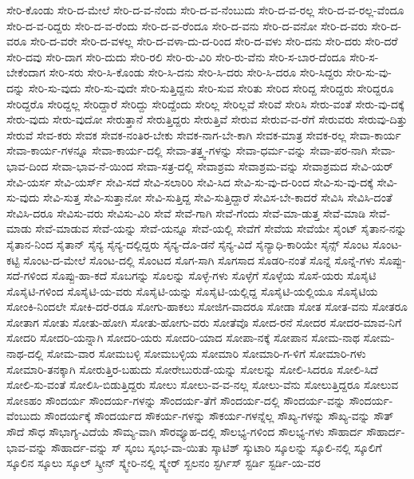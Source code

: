 {ಸೇರಿ-ಕೊಂಡು
ಸೇರಿ-ದ-ಮೇಲೆ
ಸೇರಿ-ದ-ವ-ನೆಂದು
ಸೇರಿ-ದ-ವ-ನೆಂಬುದು
ಸೇರಿ-ದ-ವ-ರಲ್ಲ
ಸೇರಿ-ದ-ವ-ರಲ್ಲ-ವೆಂದೂ
ಸೇರಿ-ದ-ವ-ರಿದ್ದರು
ಸೇರಿ-ದ-ವ-ರೆಂದು
ಸೇರಿ-ದ-ವ-ರೆಂದೂ
ಸೇರಿ-ದ-ವನು
ಸೇರಿ-ದ-ವನೋ
ಸೇರಿ-ದ-ವರು
ಸೇರಿ-ದ-ವರೂ
ಸೇರಿ-ದ-ವರೇ
ಸೇರಿ-ದ-ವಳಲ್ಲ
ಸೇರಿ-ದ-ವಳಾ-ದು-ದ-ರಿಂದ
ಸೇರಿ-ದ-ವಳು
ಸೇರಿ-ದನು
ಸೇರಿ-ದರು
ಸೇರಿ-ದರೆ
ಸೇರಿ-ದವು
ಸೇರಿ-ದಾಗ
ಸೇರಿ-ದುದು
ಸೇರಿ-ರಲಿ
ಸೇರಿ-ರು-ವಿರಿ
ಸೇರಿ-ರು-ವೆನು
ಸೇರಿ-ಸ-ಬಾರ-ದೆಂದೂ
ಸೇರಿ-ಸ-ಬೇಕೆಂದಾಗ
ಸೇರಿ-ಸರು
ಸೇರಿ-ಸಿ-ಕೊಂಡು
ಸೇರಿ-ಸಿ-ದನು
ಸೇರಿ-ಸಿ-ದರು
ಸೇರಿ-ಸಿ-ದರೂ
ಸೇರಿ-ಸಿದ್ದರು
ಸೇರಿ-ಸು-ವು-ದನ್ನು
ಸೇರಿ-ಸು-ವುದು
ಸೇರಿ-ಸು-ವುದೇ
ಸೇರಿ-ಸುತ್ತಿದ್ದನು
ಸೇರಿ-ಸುವ
ಸೇರಿತು
ಸೇರಿದ
ಸೇರಿದ್ದ
ಸೇರಿದ್ದರು
ಸೇರಿದ್ದರೂ
ಸೇರಿದ್ದರೊ
ಸೇರಿದ್ದಲ್ಲ
ಸೇರಿದ್ದಾರೆ
ಸೇರಿದ್ದು
ಸೇರಿದ್ದೆಂದು
ಸೇರಿಲ್ಲ
ಸೇರಿಲ್ಲವೆ
ಸೇರಿವೆ
ಸೇರಿಸಿ
ಸೇರು-ವಂತೆ
ಸೇರು-ವು-ದಕ್ಕೆ
ಸೇರು-ವುದು
ಸೇರು-ವುದೋ
ಸೇರುತ್ತಾನೆ
ಸೇರುತ್ತಿದ್ದರು
ಸೇರುತ್ತಿವೆ
ಸೇರುವ
ಸೇರುವ-ವ-ರೆಗೆ
ಸೇರುವರು
ಸೇರುವು-ದಿತ್ತು
ಸೇರುವೆ
ಸೇವ-ಕರು
ಸೇವಕ
ಸೇವಕ-ನಂತಿರ-ಬೇಕು
ಸೇವಕ-ನಾಗ-ಬೇ-ಕಾಗಿ
ಸೇವಕ-ಮಾತ್ರ
ಸೇವಕ-ರಲ್ಲ
ಸೇವಾ-ಕಾರ್ಯ
ಸೇವಾ-ಕಾರ್ಯ-ಗಳನ್ನೂ
ಸೇವಾ-ಕಾರ್ಯ-ದಲ್ಲಿ
ಸೇವಾ-ತತ್ತ್ವ-ಗಳನ್ನು
ಸೇವಾ-ಧರ್ಮ-ವನ್ನು
ಸೇವಾ-ಪರ-ನಾಗಿ
ಸೇವಾ-ಭಾವ-ದಿಂದ
ಸೇವಾ-ಭಾವ-ನೆ-ಯಿಂದ
ಸೇವಾ-ಸತ್ರ-ದಲ್ಲಿ
ಸೇವಾಶ್ರಮ
ಸೇವಾಶ್ರಮ-ವನ್ನು
ಸೇವಾಶ್ರಮದ
ಸೇವಿ-ಯರ್
ಸೇವಿ-ಯರ್ಸ
ಸೇವಿ-ಯರ್ಸ್
ಸೇವಿ-ಸದೆ
ಸೇವಿ-ಸಲಾರಿರಿ
ಸೇವಿ-ಸಿದ
ಸೇವಿ-ಸು-ವು-ದ-ರಿಂದ
ಸೇವಿ-ಸು-ವು-ದಕ್ಕೆ
ಸೇವಿ-ಸು-ವುದು
ಸೇವಿ-ಸುತ್ತ
ಸೇವಿ-ಸುತ್ತಾನೋ
ಸೇವಿ-ಸುತ್ತಿದ್ದ
ಸೇವಿ-ಸುತ್ತಿದ್ದಾರೆ
ಸೇವಿಸ-ಬೇ-ಕಾದರೆ
ಸೇವಿಸಿ
ಸೇವಿಸಿ-ದಂತೆ
ಸೇವಿಸಿ-ದರೂ
ಸೇವಿಸು-ವರು
ಸೇವಿಸು-ವಿರಿ
ಸೇವೆ
ಸೇವೆ-ಗಾಗಿ
ಸೇವೆ-ಗೆಂದು
ಸೇವೆ-ಮಾ-ಡುತ್ತ
ಸೇವೆ-ಮಾಡಿ
ಸೇವೆ-ಮಾಡು
ಸೇವೆ-ಮಾಡುವ
ಸೇವೆ-ಯನ್ನು
ಸೇವೆ-ಯನ್ನೂ
ಸೇವೆ-ಯಲ್ಲಿ
ಸೇವೆಗೆ
ಸೇವೆಯ
ಸೇವೆಯೇ
ಸೈಂಟ್
ಸೈತಾನ-ನನ್ನು
ಸೈತಾನ-ನಿಂದ
ಸೈತಾನ್
ಸೈನ್ಯ
ಸೈನ್ಯ-ದಲ್ಲಿದ್ದರು
ಸೈನ್ಯ-ದೊ-ಡನೆ
ಸೈನ್ಯ-ವಿದೆ
ಸೈನ್ಯಾಧಿ-ಕಾರಿಯೇ
ಸೈನ್ಸ್
ಸೊಂಟ
ಸೊಂಟ-ಕಟ್ಟಿ
ಸೊಂಟ-ದ-ಮೇಲೆ
ಸೊಂಟ-ದಲ್ಲಿ
ಸೊಂಟದ
ಸೊಗ-ಸಾಗಿ
ಸೊಗಸಾದ
ಸೊಡರಿ-ನಂತೆ
ಸೊನ್ನೆ
ಸೊನ್ನೆ-ಗಳು
ಸೊಪ್ಪು-ಸದೆ-ಗಳಿಂದ
ಸೊಪ್ಪು-ಹಾ-ಕದೆ
ಸೊಬಗನ್ನು
ಸೊಲನ್ನು
ಸೊಳ್ಳೆ-ಗಳು
ಸೊಳ್ಳೆಗೆ
ಸೊಳ್ಳೆಯ
ಸೊಸೆ-ಯರು
ಸೊಸೈಟಿ
ಸೊಸೈಟಿ-ಗಳಿಂದ
ಸೊಸೈಟಿ-ಯ-ವರು
ಸೊಸೈಟಿ-ಯನ್ನು
ಸೊಸೈಟಿ-ಯಲ್ಲಿದ್ದ
ಸೊಸೈಟಿ-ಯಲ್ಲಿಯೂ
ಸೊಸೈಟಿಯ
ಸೋಂಕಿ-ನಿಂದಲೇ
ಸೋಕಿ-ದರೆ-ರಡೂ
ಸೋಗು-ಹಾಕಲು
ಸೋಜಿಗ-ವಾದರೂ
ಸೋಡಾ
ಸೋತ
ಸೋತ-ವನು
ಸೋತರೂ
ಸೋತಾಗ
ಸೋತು
ಸೋತು-ಹೋಗಿ
ಸೋತು-ಹೋಗು-ವರು
ಸೋತೆವೊ
ಸೋದ-ರನೆ
ಸೋದರ
ಸೋದರ-ಮಾವ-ನಿಗೆ
ಸೋದರಿ
ಸೋದರಿ-ಯನ್ನಾಗಿ
ಸೋದರಿ-ಯರು
ಸೋದರಿ-ಯಾದ
ಸೋಪಾ-ನಕ್ಕೆ
ಸೋಪಾನ
ಸೋಮ-ನಾಥ
ಸೋಮ-ನಾಥ-ದಲ್ಲಿ
ಸೋಮ-ವಾರ
ಸೋಮಬಳ್ಳಿ
ಸೋಮಬಳ್ಳಿಯ
ಸೋಮಾರಿ
ಸೋಮಾರಿ-ಗ-ಳಿಗೆ
ಸೋಮಾರಿ-ಗಳು
ಸೋಮಾರಿ-ತನಕ್ಕಾಗಿ
ಸೋರುತ್ತಿರ-ಬಹುದು
ಸೋರೇಬುರುಡೆ-ಯನ್ನು
ಸೋಲನ್ನು
ಸೋಲಿ-ಸಿದರೂ
ಸೋಲಿ-ಸಿದೆ
ಸೋಲಿ-ಸು-ವಂತೆ
ಸೋಲಿಸಿ-ಬಿಡುತ್ತಿದ್ದರು
ಸೋಲು
ಸೋಲು-ವ-ವ-ನಲ್ಲ
ಸೋಲು-ವೆನು
ಸೋಲುತ್ತಿದ್ದರೂ
ಸೋಲುವ
ಸೋಽಹಂ
ಸೌಂದರ್ಯ
ಸೌಂದರ್ಯ-ಗಳನ್ನು
ಸೌಂದರ್ಯ-ತೆಗೆ
ಸೌಂದರ್ಯ-ದಲ್ಲಿ
ಸೌಂದರ್ಯ-ವನ್ನು
ಸೌಂದರ್ಯ-ವೆಂಬುದು
ಸೌಂದರ್ಯಕ್ಕೆ
ಸೌಂದರ್ಯದ
ಸೌಕರ್ಯ-ಗಳನ್ನು
ಸೌಕರ್ಯ-ಗಳನ್ನೆಲ್ಲ
ಸೌಖ್ಯ-ಗಳನ್ನು
ಸೌಖ್ಯ-ವನ್ನು
ಸೌತ್
ಸೌದೆ
ಸೌಧ
ಸೌಭಾಗ್ಯ-ವಿದೆಯೆ
ಸೌಮ್ಯ-ವಾಗಿ
ಸೌರವ್ಯೂಹ-ದಲ್ಲಿ
ಸೌಲಭ್ಯ-ಗಳಿಂದ
ಸೌಲಭ್ಯ-ಗಳು
ಸೌಹಾರ್ದ
ಸೌಹಾರ್ದ-ಭಾವ-ವನ್ನು
ಸೌಹಾರ್ದ-ವನ್ನು
ಸ್
ಸ್ಕಂಬ
ಸ್ಕಂಭ-ವಾ-ಯಿತು
ಸ್ಕಾಟಿಶ್
ಸ್ಕುಟಾರಿ
ಸ್ಕೂಲನ್ನು
ಸ್ಕೂಲಿ-ನಲ್ಲಿ
ಸ್ಕೂಲಿಗೆ
ಸ್ಕೂಲಿನ
ಸ್ಕೂಲು
ಸ್ಕೂಲ್
ಸ್ಕ್ರೀನ್
ಸ್ಕ್ವೇರಿ-ನಲ್ಲಿ
ಸ್ಕ್ವೇರ್
ಸ್ಖಲನಂ
ಸ್ಟರ್ಗಿಸ್
ಸ್ಟರ್ಡಿ
ಸ್ಟರ್ಡಿ-ಯ-ವರ
}

